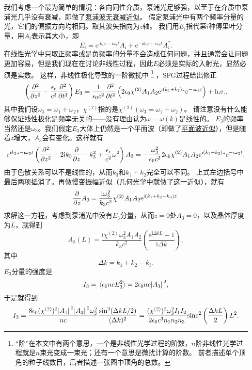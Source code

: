\documentclass[UTF8, a4paper]{ctexart}
\newcommand*{\ee}{\mathrm{e}}
\newcommand*{\ii}{\mathrm{i}}
\newcommand{\concept}[1]{\underline{#1}}
\begin{document}
我们考虑一个最为简单的情况：各向同性介质，泵浦光足够强，以至于在介质中泵浦光几乎没有衰减，即做了\concept{泵浦波无衰减近似}。
假定泵浦光中有两个频率分量的光，它们的偏振方向均相同。取其波矢指向为$z$轴。
我们用$E_i$指代第$i$种傅里叶分量，用$A_i$表示其大小，即
\[
    E_i = \ee^{\ii k_i z - \ii \omega_i t} A_i + \ee^{- \ii k_i z + \ii \omega_i t} A_i^*.
\]
在线性光学中只取正频率或是负频率的分量不会造成任何问题，并且通常会让问题更加容易，但是我们现在在讨论非线性过程，因此$E$必须是实际的入射光，显然必须是实数。
这样，非线性极化导致的一阶微扰中%
\footnote{
    “阶”在本文中有两个意思，一个是非线性光学过程的阶数，$n$阶非线性光学过程就是$n$束光变成一束光；还有一个意思是微扰计算的阶数。
    前者描述单个顶角的粒子线数目，后者描述一张图中顶角的总数。
}%
，SFG过程给出修正
\[
    \left( \pdv[2]{z} - \frac{\epsilon_\text{r}}{c^2} \pdv[2]{t} \right) E_3 = \frac{1}{\epsilon_0 c^2} \pdv[2]{t} \left( 2 \epsilon_0  \chi^{(2)} A_1 A_2 \ee^{\ii (k_1 + k_2) z} \ee^{-\ii \omega_3 t} \right) + \text{h.c.},
\]
其中我们设$\omega_3 = \omega_1 + \omega_2$，$\chi^{(2)}$指的是$\chi^{(2)}(\omega_3=\omega_1+\omega_2)$。
请注意没有什么能够保证线性极化是频率无关的——没有理由认为$\omega=\omega(k)$是线性的。
$E_3$的频率当然还是$\omega_3$。我们假定$E_3$大体上仍然是一个平面波（即做了\concept{平面波近似}），但是随着$z$增大，$A_3$会有变化。这样就有
\[
    \ee^{\ii k_3 z - \ii \omega_3 t} \left( \pdv[2]{z} + 2 \ii k_3 \pdv{z} - k_3^2 + \frac{\epsilon_\text{r}}{c^2} \omega^2 \right) A_3 = - \frac{\omega_3^2}{\epsilon_0 c^2} 2 \epsilon_0  \chi^{(2)} A_1 A_2 \ee^{\ii (k_1 + k_2) z} \ee^{-\ii \omega_3 t} .
\]
由于色散关系可以不是线性的，从而$k_3$和$k_1 + k_2$完全可以不同。
上式左边括号中最后两项抵消了。再做慢变振幅近似（几何光学中就做了这一近似），就有
\[
    \pdv{z} A_3 = \frac{\ii \omega_3^2}{k_3 c^2} \chi^{(2)} A_1 A_2 \ee^{\ii (k_1 + k_2 - k_3) z}.
\]
求解这一方程，考虑到泵浦光中没有$E_3$分量，从而$z=0$处$A_3=0$，以及晶体厚度为$L$，就得到
\begin{equation}
    A_3(L) = \frac{\ii \chi^{(2)} \omega_3^2 A_1 A_2}{k_3 c^2} \left( \frac{\ee^{\ii \Delta k L} - 1}{\ii \Delta k} \right),
\end{equation}
其中
\begin{equation}
    \Delta k = k_1 + k_2 - k_3.
\end{equation}
$E_3$分量的强度是
\[
    I_3 = \expval*{\epsilon_0 n c E_3^2} = 2 \epsilon_0 n c \abs*{A_3}^2,
\]
于是就得到
\begin{equation}
    I_3 = \frac{8 \epsilon_0 (\chi^{(2)})^2 \abs*{A_1}^2 \abs*{A_2}^2 \omega_3^2}{nc} \frac{\sin^2(\Delta k L / 2)}{(\Delta k)^2} = \frac{(\chi^{(2)})^2 \omega_3^2 I_1 I_2}{2 \epsilon_0 c^3 n_1 n_2 n_3} \mathrm{sinc}^2 \left( \frac{\Delta k L}{2} \right) L^2.
    \label{eq:sfg-intensity}
\end{equation}
\end{document}
